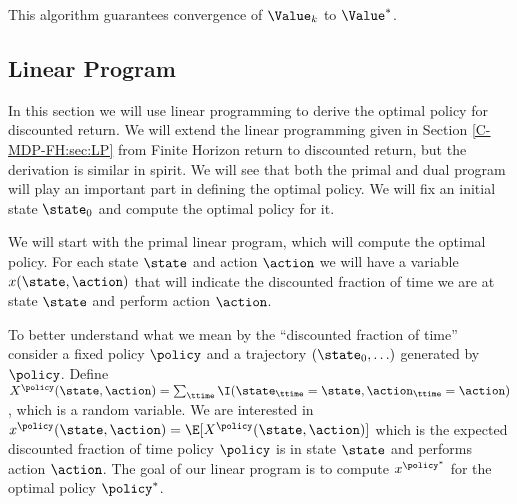 This algorithm guarantees convergence of ${\Value_ k}$ to
${\Value^*}$.



\begin{leftbar}
\section{Linear Program}
\label{chapter-discount:section:LP}




In this section we will use linear programming to derive the optimal
policy for discounted return.
%
We will extend the linear programming given in Section
\ref{C-MDP-FH:sec:LP} from Finite Horizon return to discounted
return, but the derivation is similar in spirit.
%
%
We will see that both the primal and dual program will play an
important part in defining the optimal policy. We will fix an
initial state $\state_0$ and compute the optimal policy for it.

We will start with the primal linear program, which will compute the
optimal policy. For each state $\state$ and action $\action$ we will
have a variable $x(\state,\action)$ that will indicate the
discounted fraction of time we are at state $\state$ and perform
action $\action$.

To better understand what we mean by the ``discounted fraction of
time'' consider a fixed policy $\policy$ and a trajectory
$(\state_0, \ldots )$ generated by $\policy$. Define
$X^\policy(\state,\action)=\sum_\ttime
\I(\state_\ttime=\state,\action_\ttime=\action)$, which is a random
variable. We are interested in
$x^\policy(\state,\action)=\E[X^\policy(\state,\action)]$ which is
the expected discounted fraction of time policy $\policy$ is in
state $\state$ and performs action $\action$. The goal of our linear
program is to compute $x^{\policy^*}$ for the optimal policy
$\policy^*$.


\end{leftbar}
